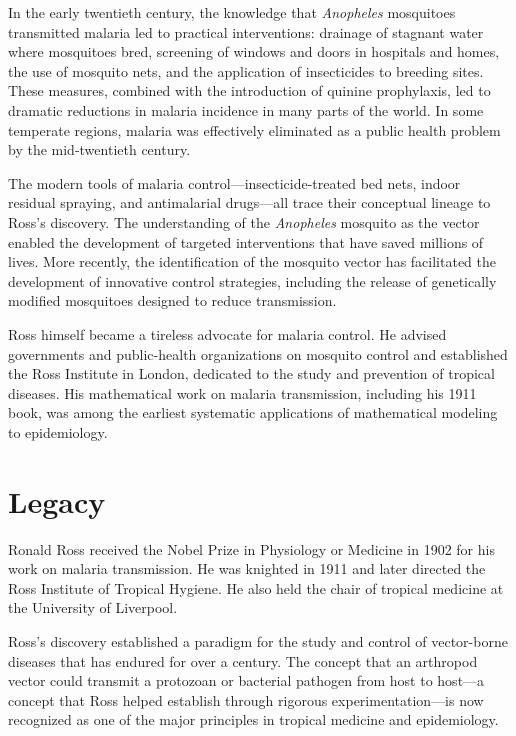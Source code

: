 In the early twentieth century, the knowledge that \emph{Anopheles} mosquitoes transmitted malaria led to practical interventions: drainage of stagnant water where mosquitoes bred, screening of windows and doors in hospitals and homes, the use of mosquito nets, and the application of insecticides to breeding sites. These measures, combined with the introduction of quinine prophylaxis, led to dramatic reductions in malaria incidence in many parts of the world. In some temperate regions, malaria was effectively eliminated as a public health problem by the mid-twentieth century.

The modern tools of malaria control---insecticide-treated bed nets, indoor residual spraying, and antimalarial drugs---all trace their conceptual lineage to Ross's discovery. The understanding of the \emph{Anopheles} mosquito as the vector enabled the development of targeted interventions that have saved millions of lives. More recently, the identification of the mosquito vector has facilitated the development of innovative control strategies, including the release of genetically modified mosquitoes designed to reduce transmission.

Ross himself became a tireless advocate for malaria control. He advised governments and public-health organizations on mosquito control and established the Ross Institute in London, dedicated to the study and prevention of tropical diseases. His mathematical work on malaria transmission, including his 1911 book, was among the earliest systematic applications of mathematical modeling to epidemiology.

\section{Legacy}

Ronald Ross received the Nobel Prize in Physiology or Medicine in 1902 for his work on malaria transmission. He was knighted in 1911 and later directed the Ross Institute of Tropical Hygiene. He also held the chair of tropical medicine at the University of Liverpool.

Ross's discovery established a paradigm for the study and control of vector-borne diseases that has endured for over a century. The concept that an arthropod vector could transmit a protozoan or bacterial pathogen from host to host---a concept that Ross helped establish through rigorous experimentation---is now recognized as one of the major principles in tropical medicine and epidemiology.

